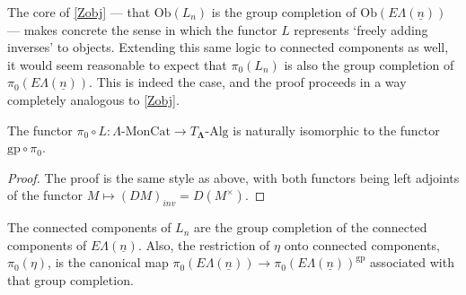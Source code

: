 \documentclass{amsbook} %
\newcommand{\ML}{\mathbf{\Lambda}}
\newcommand{\ELn}{E\Lambda(\underline{n})}
\newcommand{\lmc}{\Lambda\mbox{-}\textrm{MonCat}}
\newenvironment{eq*}{\begin{equation*}}{\end{equation*}}
\numberwithin{section}{chapter}
\begin{document}


The core of \cref{Zobj} --- that $\mathrm{Ob}(L_n)$ is the group completion of $\mathrm{Ob}(\ELn)$ --- makes concrete the sense in which the functor $L$ represents `freely adding inverses' to objects. Extending this same logic to connected components as well, it would seem reasonable to expect that $\pi_0(L_n)$ is also the group completion of $\pi_0(\ELn)$. This is indeed the case, and the proof proceeds in a way completely analogous to \cref{Zobj}. 



\begin{prop}\label{pilel_gppiel}
The functor $\pi_0 \circ L: \lmc \to T_{\ML}\mbox{-}\textrm{Alg}$ is naturally isomorphic to the functor $\textrm{gp} \circ \pi_0$.
\end{prop}
\begin{proof}
The proof is the same style as above, with both functors being  left adjoints of the functor $M \mapsto (DM)_{inv} = D(M^{\times})$.
\end{proof}
\begin{cor}\label{Zconcomp} The connected components of $L_n$ are the group completion of the connected components of $\ELn$. Also, the restriction of $\eta$ onto connected components, $\pi_0(\eta)$, is the canonical map $\pi_0(\ELn) \to \pi_0(\ELn)^{\mathrm{gp}}$ associated with that group completion.
\end{cor}
\end{document}

